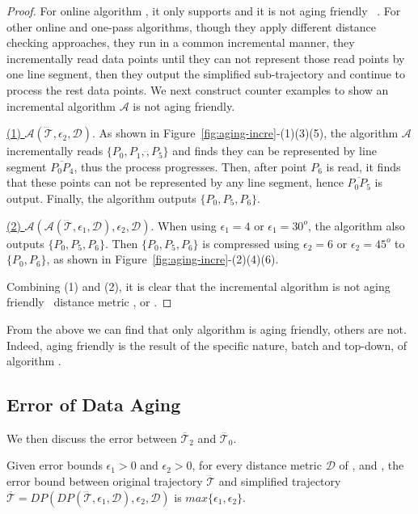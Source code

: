 \begin{proof}
	For online algorithm \squishe, it only supports \sed and it is not aging friendly \wrt~\sed.
	For other online and one-pass algorithms, though they apply different distance checking approaches, they run in a common incremental manner, \ie they incrementally read data points until they can not represent those read points by one line segment, then they output the simplified sub-trajectory and continue to process the rest data points. We next construct counter examples to show an incremental algorithm $\mathcal{A}$ is not aging friendly.
	
	\underline{(1) ${\mathcal{A}}(\dddot{\mathcal{T}}, \epsilon_2, \mathcal{D})$}. As shown in Figure~\ref{fig:aging-incre}-(1)(3)(5), the algorithm $\mathcal{A}$ incrementally reads $\{P_0, P_1,\dddot, P_5\}$ and finds they can be represented by line segment $\overline{P_0P_4}$, thus the process progresses. Then, after point $P_6$ is read, it finds that these points can not be represented by any line segment, hence $\overline{P_0P_5}$ is output. Finally, the algorithm outputs $\{P_0, P_5, P_6\}$.
	
	\underline{(2) ${\mathcal{A}}(\mathcal{A}(\dddot{\mathcal{T}}, \epsilon_1, \mathcal{D}), \epsilon_2, \mathcal{D})$}. When using $\epsilon_1=4$ or $\epsilon_1=30^o $, the algorithm also outputs $\{P_0, P_5, P_6\}$. Then $\{P_0, P_5, P_6\}$ is compressed using $\epsilon_2=6$ or $\epsilon_2=45^o$ to $\{P_0, P_6\}$, as shown in Figure~\ref{fig:aging-incre}-(2)(4)(6).
	
	Combining (1) and (2), it is clear that the incremental algorithm is not aging friendly \wrt~distance metric \ped, \sed or \dad.
\end{proof}

From the above we can find that only algorithm \dpa is aging friendly, others are not. Indeed, {aging friendly} is the result of the {specific nature}, \ie batch and top-down, of algorithm \dpa.


\subsection{Error of Data Aging}
We then discuss the error between $\overline{\mathcal{T}}_2$ and $\dddot{\mathcal{T}_0}$.


\begin{theorem}
	\label{theo-aging-dp}
	Given error bounds $\epsilon_1>0$ and $\epsilon_2>0$, for every distance metric $\mathcal{D}$ of \ped, \sed and \dad, the error bound between original trajectory $\dddot{\mathcal{T}}$ and simplified trajectory $\overline{\mathcal{T}}=DP(DP(\dddot{\mathcal{T}}, \epsilon_1, \mathcal{D}), \epsilon_2, \mathcal{D})$ is $max\{\epsilon_1, \epsilon_2\}$.
\end{theorem}

